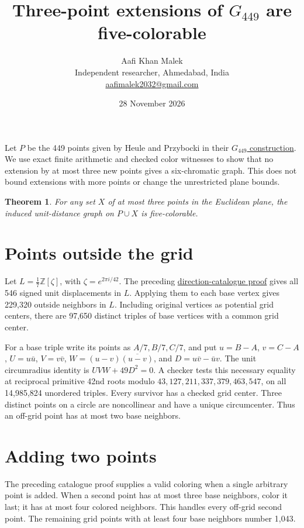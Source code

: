 \documentclass[11pt,letterpaper]{article}
\title{Three-point extensions of \(G_{449}\) are five-colorable}
\author{Aafi Khan Malek\\ \small Independent researcher, Ahmedabad, India\\
\small\href{mailto:aafimalek2032@gmail.com}{aafimalek2032@gmail.com}}
\date{28 November 2026}
\newtheorem{theorem}{Theorem}
\begin{document}
\maketitle
Let \(P\) be the 449 points given by Heule and Przybocki in their
\href{https://arxiv.org/abs/2611.28518}{\(G_{449}\) construction}.
We use exact finite arithmetic and checked color witnesses to show
that no extension by at most three new points gives a six-chromatic
graph. This does not bound extensions with more points or change
the unrestricted plane bounds.

\begin{theorem}
For any set \(X\) of at most three points in the Euclidean plane,
the induced unit-distance graph on \(P\cup X\) is five-colorable.
\end{theorem}

\section{Points outside the grid}

Let \(L=\tfrac17\mathbb Z[\zeta]\), with \(\zeta=e^{2\pi i/42}\).
The preceding
\href{https://github.com/Aafimalek/novel-discoveries/tree/74e7bf325ddbe52d125453683083c073f451c3fc/hadwiger-nelson/verification/g449/prime-seven-catalogue}
{direction-catalogue proof}
gives all 546 signed unit displacements in \(L\). Applying them to
each base vertex gives 229,320 outside neighbors in \(L\).
Including original vertices as potential grid centers, there are
97,650 distinct triples of base vertices with a common grid center.

For a base triple write its points as \(A/7,B/7,C/7\), and put
\(u=B-A\), \(v=C-A\), \(U=u\bar u\), \(V=v\bar v\),
\(W=(u-v)\overline{(u-v)}\), and \(D=u\bar v-\bar u v\).
The unit circumradius identity is \(UVW+49D^2=0\). A checker
tests this necessary equality at reciprocal primitive
42nd roots modulo \(43,127,211,337,379,463,547\), on all
14,985,824 unordered triples. Every survivor has a checked
grid center. Three distinct points on a circle are noncollinear
and have a unique circumcenter. Thus an off-grid point has at
most two base neighbors.

\section{Adding two points}

The preceding catalogue proof supplies a valid coloring when a
single arbitrary point is added. When a second point has at most
three base neighbors, color it last; it has at most four colored
neighbors. This handles every off-grid second point. The remaining
grid points with at least four base neighbors number 1,043.
\end{document}

